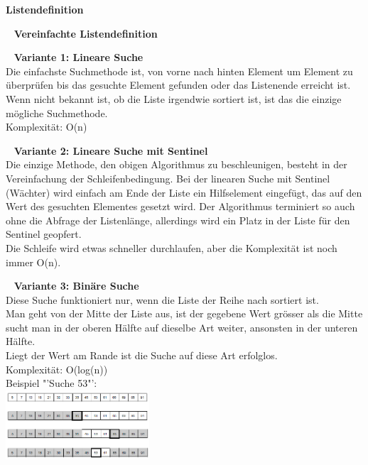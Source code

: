 \textbf{Listendefinition}

\ \newline
\textbf{Vereinfachte Listendefinition}

\ \newline
\textbf{Variante 1: Lineare Suche}\\
Die einfachste Suchmethode ist, von vorne nach hinten Element um Element zu überprüfen bis das gesuchte Element gefunden oder das Listenende erreicht ist. Wenn nicht bekannt ist, ob die Liste irgendwie sortiert ist, ist das die einzige mögliche Suchmethode. \\
Komplexität: O(n)

\ \newline
\textbf{Variante 2: Lineare Suche mit Sentinel}\\
Die einzige Methode, den obigen Algorithmus zu beschleunigen, besteht in der Vereinfachung der
Schleifenbedingung. Bei der linearen Suche mit Sentinel (Wächter) wird einfach am Ende der Liste ein Hilfselement eingefügt, das auf den Wert des gesuchten Elementes gesetzt wird. Der Algorithmus terminiert so auch ohne die Abfrage der Listenlänge, allerdings wird ein Platz in der Liste für den Sentinel geopfert.\\
Die Schleife wird etwas schneller durchlaufen, aber die Komplexität ist noch immer O(n).

\ \newline
\textbf{Variante 3: Binäre Suche}\\
Diese Suche funktioniert nur, wenn die Liste der Reihe nach sortiert ist.\\
Man geht von der Mitte der Liste aus, ist der gegebene Wert grösser als die Mitte sucht man in der oberen Hälfte auf dieselbe Art weiter, ansonsten in der unteren Hälfte.\\
Liegt der Wert am Rande ist die Suche auf diese Art erfolglos.\\
Komplexität: O(log(n))\\

Beispiel "'Suche 53"':\\
\includegraphics[width=0.4\textwidth]{images/Algorithmen/BinaereSuche.png}


